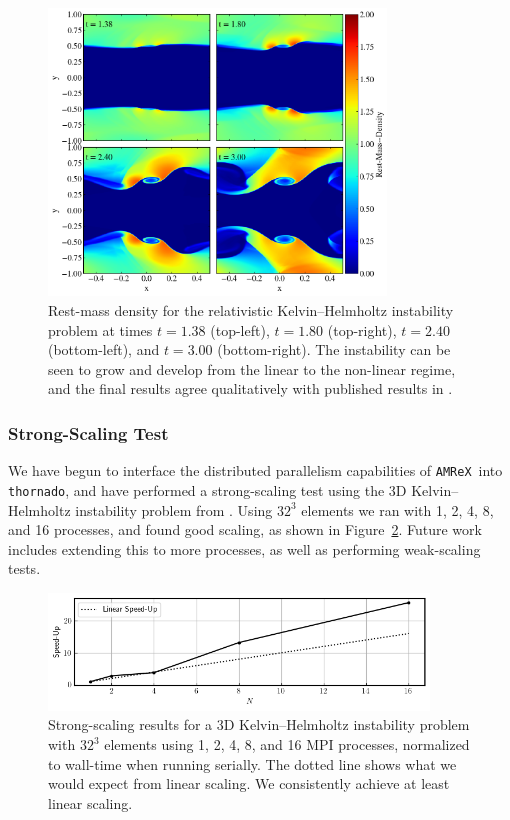 \documentclass[letterpaper]{jpconf}
\newcommand{\thornado}{\texttt{thornado}}
\newcommand{\amrex}{\texttt{AMReX}}
\newcommand{\figref}[1]{Figure~\ref{#1}}
\begin{document}
\begin{figure}
\centering
\includegraphics[width=0.8\textwidth]{Images/KHI.png}
\caption{Rest-mass density for the relativistic Kelvin--Helmholtz instability problem at times $t=1.38$ (top-left), $t=1.80$ (top-right), $t=2.40$ (bottom-left), and $t=3.00$ (bottom-right). The instability can be seen to grow and develop from the linear to the non-linear regime, and the final results agree qualitatively with published results in \cite{RadiceRezzolla2012}.}
\label{Fig:KHI}
\end{figure}

\subsubsection{Strong-Scaling Test}
We have begun to interface the distributed parallelism capabilities of \amrex\ into \thornado, and have performed a strong-scaling test using the 3D Kelvin--Helmholtz instability problem from \cite{RadiceRezzolla2012}. Using $32^3$ elements we ran with 1, 2, 4, 8, and 16 processes, and found good scaling, as shown in \figref{Fig:StrongScaling}. Future work includes extending this to more processes, as well as performing weak-scaling tests.

\begin{figure}
  \centering
  \includegraphics[width=0.9\textwidth]{Images/StrongScaling.png}
  \caption{Strong-scaling results for a 3D Kelvin--Helmholtz instability problem with $32^{3}$ elements using 1, 2, 4, 8, and 16 MPI processes, normalized to wall-time when running serially. The dotted line shows what we would expect from linear scaling. We consistently achieve at least linear scaling.}
  \label{Fig:StrongScaling}
\end{figure}
\end{document}
